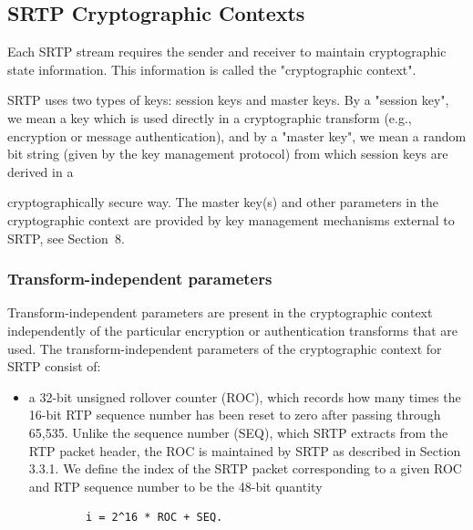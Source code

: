 \documentclass{article}
\begin{document}
\subsection{SRTP Cryptographic Contexts}

Each SRTP stream requires the sender and receiver to maintain cryptographic state information.  This information is called the "cryptographic context".

SRTP uses two types of keys: session keys and master keys.  By a "session key", we mean a key which is used directly in a cryptographic transform (e.g., encryption or message authentication), and by a "master key", we mean a random bit string (given by the key management protocol) from which session keys are derived in a

cryptographically secure way.  The master key(s) and other parameters in the cryptographic context are provided by key management mechanisms external to SRTP, see Section~8.

\subsubsection{Transform-independent parameters}

Transform-independent parameters are present in the cryptographic context independently of the particular encryption or authentication transforms that are used.  The transform-independent parameters of the cryptographic context for SRTP consist of:

\begin{itemize}
\item a 32-bit unsigned rollover counter (ROC), which records how many times the 16-bit RTP sequence number has been reset to zero after passing through 65,535.  Unlike the sequence number (SEQ), which SRTP extracts from the RTP packet header, the ROC is maintained by SRTP as described in Section 3.3.1.
We define the index of the SRTP packet corresponding to a given ROC and RTP sequence number to be the 48-bit quantity

\end{itemize}
\begin{verbatim}
            i = 2^16 * ROC + SEQ.
\end{verbatim}
\end{document}
